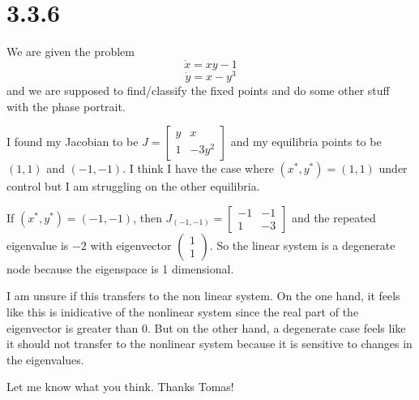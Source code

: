 \documentclass{article}
\begin{document}
\section*{3.3.6}
We are given the problem
$$ \dot{x} = xy - 1 $$
$$ \dot{y} = x - y^3 $$
and we are supposed to find/classify the fixed points and do some other stuff with the phase portrait.

I found my Jacobian to be $J = \begin{bmatrix} y & x \\ 1 & -3y^2 \end{bmatrix} $ and my equilibria points to be $(1,1)$ and $(-1,-1)$.
I think I have the case where $(x^*, y^*) = (1,1)$ under control but I am struggling on the other equilibria.

If $(x^*, y^*) = (-1,-1)$, then $J_{(-1,-1)} = \begin{bmatrix} -1 & -1 \\ 1 & -3 \end{bmatrix} $ and the repeated eigenvalue is $-2$ with eigenvector $\begin{pmatrix} 1 \\ 1 \end{pmatrix}$.
So the linear system is a degenerate node because the eigenspace is 1 dimensional.

I am unsure if this transfers to the non linear system.
On the one hand, it feels like this is inidicative of the nonlinear system since the real part of the eigenvector is greater than 0.
But on the other hand, a degenerate case feels like it should not transfer to the nonlinear system because it is sensitive to changes in the eigenvalues.

Let me know what you think.
Thanks Tomas!
\end{document}
